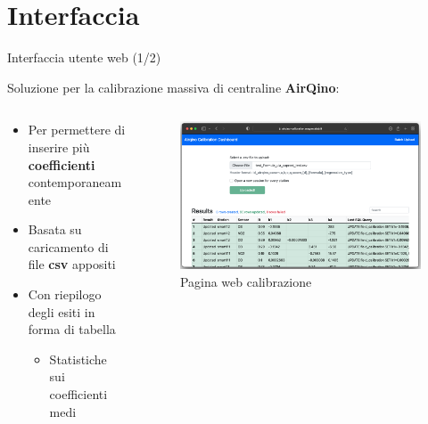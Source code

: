 \section{Interfaccia}
\begin{frame}{Interfaccia utente web (1/2)}

\vspace{-0.2cm}
\begin{center}
Soluzione per la calibrazione massiva di centraline \textbf{AirQino}:  
\end{center}

\vspace{-0.2cm}
\begin{columns}

\begin{column}{0.43\textwidth}
\vspace{-.6cm}
\begin{itemize}
  \item Per permettere di inserire più \textbf{coefficienti} contemporaneamente
  \item Basata su caricamento di file \textbf{csv} appositi
  \item Con riepilogo degli esiti in forma di tabella\vspace{.1cm}
  \begin{itemize}
  \item Statistiche sui coefficienti medi
  \end{itemize}
\end{itemize}

\end{column}

\begin{column}{0.65\textwidth}

\begin{center}
\begin{figure}[H]
\centering
\captionsetup{justification=centering}
\vspace{-0.2cm}
\includegraphics[width=\textwidth]{images/interfaccia_2_r}
\caption{Pagina web calibrazione}
\end{figure}
\end{center}

\end{column}

\end{columns}
\end{frame}

